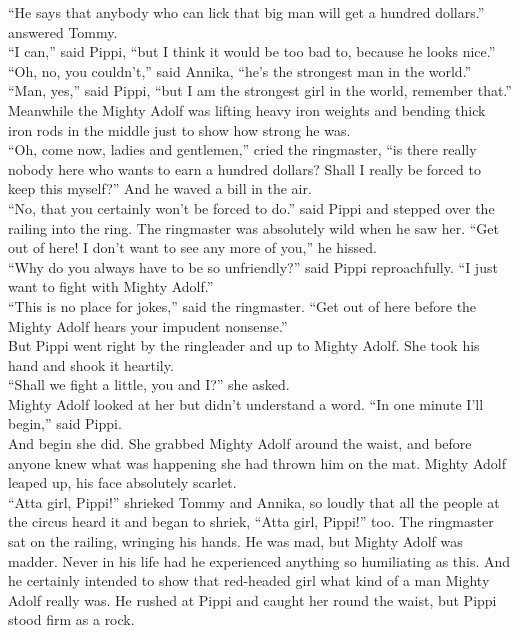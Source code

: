\documentclass{standard}
\begin{document}
“He says that anybody who can lick that big man will get a hundred dollars.” answered Tommy.\\

“I can,” said Pippi, “but I think it would be too bad to, because he looks nice.” “Oh, no, you couldn’t,” said Annika, “he’s the strongest man in the world.”\\

“Man, yes,” said Pippi, “but I am the strongest girl in the world, remember that.” Meanwhile the Mighty Adolf was lifting heavy iron weights and bending thick iron rods in the middle just to show how strong he was.\\

“Oh, come now, ladies and gentlemen,” cried the ringmaster, “is there really nobody here who wants to earn a hundred dollars? Shall I really be forced to keep this myself?” And he waved a bill in the air.\\

“No, that you certainly won’t be forced to do.” said Pippi and stepped over the railing into the ring.
The ringmaster was absolutely wild when he saw her. “Get out of here! I don’t want to see any more of you,” he hissed.\\

“Why do you always have to be so unfriendly?” said Pippi reproachfully. “I just want to fight with Mighty Adolf.”\\

“This is no place for jokes,” said the ringmaster. “Get out of here before the Mighty Adolf hears your impudent nonsense.”\\

But Pippi went right by the ringleader and up to Mighty Adolf. She took his hand and shook it heartily.\\

“Shall we fight a little, you and I?” she asked.\\

Mighty Adolf looked at her but didn’t understand a word. “In one minute I’ll begin,” said Pippi.\\

And begin she did. She grabbed Mighty Adolf around the waist, and before anyone knew what was happening she had thrown him on the mat. Mighty Adolf leaped up, his face absolutely scarlet.\\

“Atta girl, Pippi!” shrieked Tommy and Annika, so loudly that all the people at the circus heard it and began to shriek, “Atta girl, Pippi!” too. The ringmaster sat on the railing, wringing his hands. He was mad, but Mighty Adolf was madder. Never in his life had he experienced anything so humiliating as this. And he certainly intended to show that red-headed girl what kind of a man Mighty Adolf really was. He rushed at Pippi and caught her round the waist, but Pippi stood firm as a rock.\\
\end{document}
